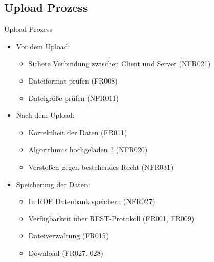 \documentclass{beamer}
\begin{document}
	\subsection[Upload Prozess]{Upload Prozess}
	\begin{frame}[<+->][t]{Upload Prozess}
		\begin{itemize}		
			\item Vor dem Upload:
			\begin{itemize}	
				\item Sichere Verbindung zwischen Client und Server (NFR021)
				\item Dateiformat prüfen (FR008)
				\item Dateigröße prüfen (NFR011)
			\end{itemize}
			
			\item Nach dem Upload:
			\begin{itemize}	
				\item Korrektheit der Daten (FR011)
				\item Algorithmus hochgeladen ? (NFR020)
				\item Verstoßen gegen bestehendes Recht (NFR031)
			\end{itemize}

			\item Speicherung der Daten:
			\begin{itemize}	
				\item In RDF Datenbank speichern (NFR027)
				\item Verfügbarkeit über REST-Protokoll (FR001, FR009)
				\item Dateiverwaltung (FR015)
				\item Download (FR027, 028)
			\end{itemize}
		\end{itemize}
	\end{frame}
		
\end{document}
